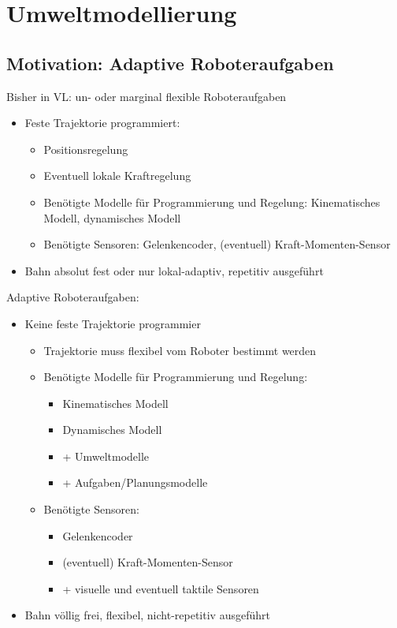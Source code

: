 \documentclass[paper=a4, fontsize=11pt]{scrartcl} %
\numberwithin{equation}{section} %
\numberwithin{figure}{section} %
\numberwithin{table}{section} %
\begin{document}
\section{Umweltmodellierung}

\subsection{Motivation: Adaptive Roboteraufgaben}

Bisher in VL: un- oder marginal flexible Roboteraufgaben
\begin{itemize}
\item Feste Trajektorie programmiert:
\begin{itemize}
\item Positionsregelung
\item Eventuell lokale Kraftregelung
\item Benötigte Modelle für Programmierung und Regelung: Kinematisches Modell, dynamisches Modell
\item Benötigte Sensoren: Gelenkencoder, (eventuell) Kraft-Momenten-Sensor
\end{itemize}
\item Bahn absolut fest oder nur lokal-adaptiv, repetitiv ausgeführt
\end{itemize}

Adaptive Roboteraufgaben:
\begin{itemize}
\item Keine feste Trajektorie programmier
\begin{itemize}
\item Trajektorie muss flexibel vom Roboter bestimmt werden
\item Benötigte Modelle für Programmierung und Regelung:
\begin{itemize}
\item Kinematisches Modell
\item Dynamisches Modell
\item + Umweltmodelle
\item + Aufgaben/Planungsmodelle
\end{itemize}
\item Benötigte Sensoren:
\begin{itemize}
\item Gelenkencoder
\item (eventuell) Kraft-Momenten-Sensor
\item + visuelle und eventuell taktile Sensoren
\end{itemize}
\end{itemize}
\item Bahn völlig frei, flexibel, nicht-repetitiv ausgeführt
\end{itemize}
\end{document}
